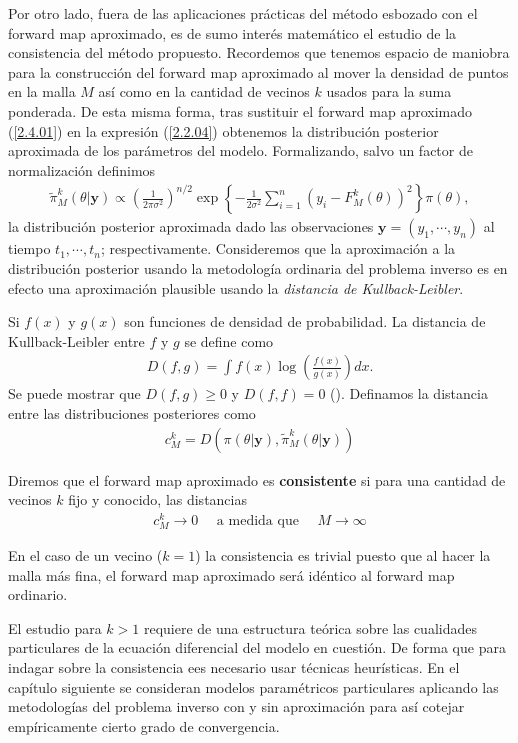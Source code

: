 Por otro lado, fuera de las aplicaciones prácticas del método esbozado con el forward map aproximado, es de sumo interés matemático el estudio de la consistencia del método propuesto. Recordemos que tenemos espacio de maniobra para la construcción del forward map aproximado al mover la densidad de puntos en la malla $M$ así como en la cantidad de vecinos $k$ usados para la suma ponderada. De esta misma forma, tras sustituir el forward map aproximado (\ref{2.4.01}) en la expresión (\ref{2.2.04}) obtenemos la distribución posterior aproximada de los parámetros del modelo. Formalizando, salvo un factor de normalización definimos
\begin{align}
    \tilde{\pi}^{k}_M(\theta|\mathbf{y}) \propto \left(\frac{1}{2\pi \sigma^2}\right) ^{n/2}\exp \left \{  -\frac{1}{2\sigma^2}\sum_{i = 1}^{n} \left(y_i - F^k_M(\theta)\right)^2 \right \}\pi(\theta),
    \label{2.4.02}
\end{align}
la distribución posterior aproximada dado las observaciones $\mathbf{y} = (y_1,\cdots, y_n)$ al tiempo $t_1, \cdots, t_n$; respectivamente. Consideremos que la aproximación a la distribución posterior usando la metodología ordinaria del problema inverso es en efecto una aproximación plausible usando la \textit{distancia de Kullback-Leibler}.

Si $f(x)$ y $g(x)$ son funciones de densidad de probabilidad. La distancia de Kullback-Leibler entre $f$ y $g$ se define como
\begin{align*}
    D(f,g) = \int f(x)\log \left(\frac{f(x)}{g(x)}\right) dx.
\end{align*}
Se puede mostrar que $D(f,g) \geq 0$ y $D(f,f) = 0$ (\cite{wasserman2006all}).
Definamos la distancia entre las distribuciones posteriores como
\begin{align*}
    c^k_M = D \left( \pi(\theta|\mathbf{y}),\tilde{\pi}^{k}_M(\theta|\mathbf{y})\right)
\end{align*}

Diremos que el forward map aproximado es \textbf{consistente} si para una cantidad de vecinos $k$ fijo y conocido, las distancias 
\begin{align*}
    c^k_M \rightarrow 0 \:\:\:\:\:\: \text{a medida que}\:\:\:\:\:\: M \rightarrow \infty
\end{align*}

En el caso de un vecino ($k = 1$) la consistencia es trivial puesto que al hacer la malla más fina, el forward map aproximado será idéntico al forward map ordinario.

El estudio para $k > 1$ requiere de una estructura teórica sobre las cualidades particulares de la ecuación diferencial del modelo en cuestión. De forma que para indagar sobre la consistencia ees necesario usar técnicas heurísticas. En el capítulo siguiente se consideran modelos paramétricos particulares aplicando las metodologías del problema inverso con y sin aproximación para así cotejar empíricamente cierto grado de convergencia.









